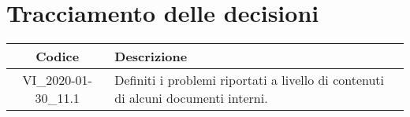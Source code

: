\section*{Tracciamento delle decisioni}

\begin{center}
	\begin{longtable}{|c|p{12.25cm}|}
	\hline
	\rowcolor{lighter-grayer}
	\textbf{Codice} & \textbf{Descrizione} \\
	\hline
	\endfirsthead
	
	\hline
	VI\_2020-01-30\_11.1 & Definiti i problemi riportati a livello di contenuti di alcuni documenti interni. \\
	\hline

	\end{longtable}
\end{center}